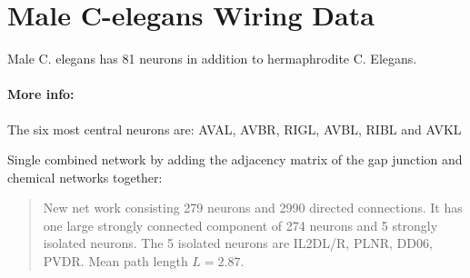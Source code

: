 \section{Male C-elegans Wiring Data}
\label{section:male wiring}

Male C. elegans has 81 neurons in addition to hermaphrodite C. Elegans.
\cite{jarrell_connectome_2012}

\paragraph{More info: }
The six most central neurons are: AVAL, AVBR, RIGL, AVBL, RIBL and AVKL

Single combined network by adding the adjacency matrix of the gap junction and chemical networks together:
\begin{quote}
New net work consisting 279 neurons and 2990 directed connections. It has one large strongly connected component of 274 neurons and 5 strongly isolated neurons. The 5
isolated neurons are IL2DL/R, PLNR, DD06, PVDR.
Mean path length $ L = 2.87 $.
\end{quote}




